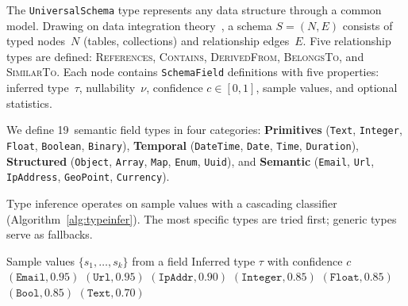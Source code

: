 \documentclass[10pt, twocolumn]{article}
\begin{document}
The \texttt{UniversalSchema} type represents any data structure through a common model. Drawing on data integration theory~\cite{doan2012principles, abiteboul1995foundations}, a schema $S = (N, E)$ consists of typed nodes~$N$ (tables, collections) and relationship edges~$E$. Five relationship types are defined: \textsc{References}, \textsc{Contains}, \textsc{DerivedFrom}, \textsc{BelongsTo}, and \textsc{SimilarTo}. Each node contains \texttt{SchemaField} definitions with five properties: inferred type~$\tau$, nullability~$\nu$, confidence $c \in [0,1]$, sample values, and optional statistics.

We define 19~semantic field types in four categories: \textbf{Primitives} (\texttt{Text}, \texttt{Integer}, \texttt{Float}, \texttt{Boolean}, \texttt{Binary}), \textbf{Temporal} (\texttt{DateTime}, \texttt{Date}, \texttt{Time}, \texttt{Duration}), \textbf{Structured} (\texttt{Object}, \texttt{Array}, \texttt{Map}, \texttt{Enum}, \texttt{Uuid}), and \textbf{Semantic} (\texttt{Email}, \texttt{Url}, \texttt{IpAddress}, \texttt{GeoPoint}, \texttt{Currency}).

Type inference operates on sample values with a cascading classifier (Algorithm~\ref{alg:typeinfer}). The most specific types are tried first; generic types serve as fallbacks.

\begin{algorithm}[t]
\caption{Semantic Type Inference from Sample Values}
\label{alg:typeinfer}
\begin{algorithmic}[1]
\REQUIRE Sample values $\{s_1, \ldots, s_k\}$ from a field
\ENSURE Inferred type $\tau$ with confidence $c$
 \RETURN $(\texttt{Email}, 0.95)$ \ENDIF
{} \RETURN $(\texttt{Url}, 0.95)$ \ENDIF
{} \RETURN $(\texttt{IpAddr}, 0.90)$ \ENDIF
{} \RETURN $(\texttt{Integer}, 0.85)$ \ENDIF
{} \RETURN $(\texttt{Float}, 0.85)$ \ENDIF
{} \RETURN $(\texttt{Bool}, 0.85)$ \ENDIF
\RETURN $(\texttt{Text}, 0.70)$
\end{algorithmic}
\end{algorithm}
\end{document}
